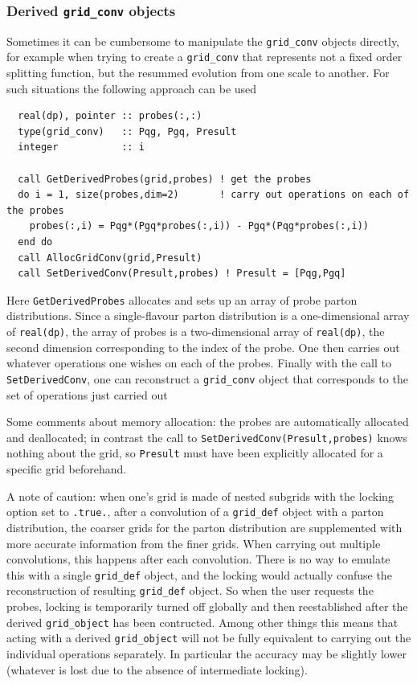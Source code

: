 \documentclass[12pt]{article}
\begin{document}
\subsubsection{Derived \texttt{grid\_conv} objects}
\label{sec:derived_grid_conv}

Sometimes it can be cumbersome to manipulate the \texttt{grid\_conv}
objects directly, for example when trying to create a
\texttt{grid\_conv} that represents not a fixed order splitting
function, but the resummed evolution from one scale to another. For
such situations the following approach can be used
\begin{verbatim}
  real(dp), pointer :: probes(:,:)
  type(grid_conv)   :: Pqg, Pgq, Presult
  integer           :: i

  call GetDerivedProbes(grid,probes) ! get the probes
  do i = 1, size(probes,dim=2)       ! carry out operations on each of the probes
    probes(:,i) = Pqg*(Pgq*probes(:,i)) - Pgq*(Pqg*probes(:,i))
  end do
  call AllocGridConv(grid,Presult)
  call SetDerivedConv(Presult,probes) ! Presult = [Pqg,Pgq]
\end{verbatim}
Here \texttt{GetDerivedProbes} allocates and sets up an array of probe
parton distributions. Since a single-flavour parton distribution is a
one-dimensional array of \texttt{real(dp)}, the array of probes is a
two-dimensional array of \texttt{real(dp)}, the second dimension
corresponding to the index of the probe. One then carries out whatever
operations one wishes on each of the probes. Finally with the call to
\texttt{SetDerivedConv}, one can reconstruct a \texttt{grid\_conv}
object that corresponds to the set of operations just carried out

Some comments about memory allocation: the probes are automatically
allocated and deallocated; in contrast the call to
\texttt{SetDerivedConv(Presult,probes)} knows nothing about the grid,
so \texttt{Presult} must have been explicitly allocated for a specific
grid beforehand.

A note of caution: when one's grid is made of nested subgrids with the
locking option set to \texttt{.true.}, after a convolution of a
\texttt{grid\_def} object with a parton distribution, the coarser
grids for the parton distribution are supplemented with more accurate
information from the finer grids. When carrying out multiple
convolutions, this happens after each convolution.  There is no way to
emulate this with a single \texttt{grid\_def} object, and the locking
would actually confuse the reconstruction of resulting
\texttt{grid\_def} object. So when the user requests the probes,
locking is temporarily turned off globally and then reestablished
after the derived \texttt{grid\_object} has been contructed. Among
other things this means that acting with a derived
\texttt{grid\_object} will not be fully equivalent to carrying out the
individual operations separately. In particular the accuracy may be
slightly lower (whatever is lost due to the absence of intermediate
locking).
\end{document}
